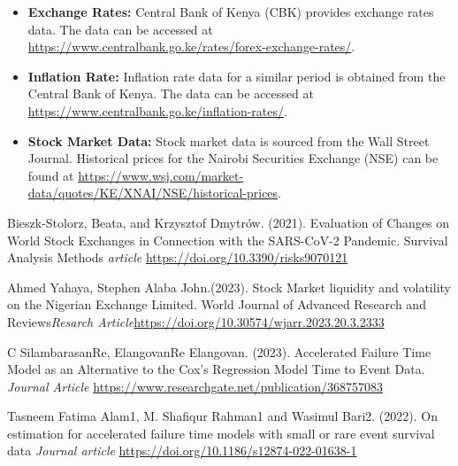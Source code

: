 \documentclass[twoside,a4paper,12pt]{article}
\begin{document}
\begin{itemize}
    \item \textbf{Exchange Rates:} Central Bank of Kenya (CBK) provides exchange rates data. The data can be accessed at \url{https://www.centralbank.go.ke/rates/forex-exchange-rates/}.
    \item \textbf{Inflation Rate:} Inflation rate data for a similar period is obtained from the Central Bank of Kenya. The data can be accessed at \url{https://www.centralbank.go.ke/inflation-rates/}.
    \item \textbf{Stock Market Data:} Stock market data is sourced from the Wall Street Journal. Historical prices for the Nairobi Securities Exchange (NSE) can be found at \url{https://www.wsj.com/market-data/quotes/KE/XNAI/NSE/historical-prices}.

\end{itemize}
\begin{thebibliography}{}
Bieszk-Stolorz, Beata, and Krzysztof Dmytrów. (2021). Evaluation of Changes on World Stock Exchanges in Connection with the SARS-CoV-2 Pandemic. Survival Analysis Methods \textit{article} \newblock\href{https://doi.org/10.3390/risks9070121}{https://doi.org/10.3390/risks9070121}


 Ahmed Yahaya, Stephen Alaba John.(2023). Stock Market liquidity and volatility on the Nigerian Exchange Limited. World Journal of Advanced Research and Reviews\textit{Resarch Article}\newblock\href{https://doi.org/10.30574/wjarr.2023.20.3.2333}{https://doi.org/10.30574/wjarr.2023.20.3.2333}

C SilambarasanRe, ElangovanRe Elangovan. (2023). Accelerated Failure Time Model as an Alternative to the Cox's Regression Model Time to Event Data. \textit{Journal Article} \newblock\href{https://www.researchgate.net/publication/368757083}{https://www.researchgate.net/publication/368757083}

Tasneem Fatima Alam1, M. Shafiqur Rahman1 and Wasimul Bari2. (2022). On estimation for accelerated failure
time models with small or rare event survival data \textit{Journal article} \newblock \href{https://doi.org/10.1186/s12874-022-01638-1}{https://doi.org/10.1186/s12874-022-01638-1}


\end{thebibliography}
\end{document}
